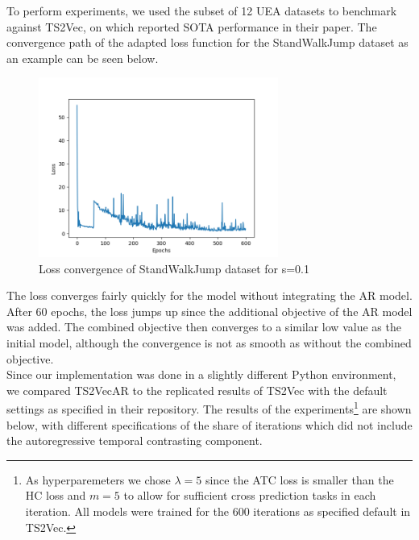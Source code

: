 \documentclass{article}
\begin{document}
To perform experiments, we used the subset of 12 UEA datasets to benchmark against TS2Vec, on which \citet{ts2vec} reported SOTA performance in their paper. The convergence path of the adapted loss function for the StandWalkJump dataset as an example can be seen below. \\

\begin{figure}[H]
  \centering
  \includegraphics[width=0.7\textwidth]{fig/StandWalkJump_default_ar_2.png}
  \caption{Loss convergence of StandWalkJump dataset for s=0.1}
\end{figure}

The loss converges fairly quickly for the model without integrating the AR model. After 60 epochs, the loss jumps up since the additional objective of the AR model was added. The combined objective then converges to a similar low value as the initial model, although the convergence is not as smooth as without the combined objective. \\

Since our implementation was done in a slightly different Python environment, we compared TS2VecAR to the replicated results of TS2Vec with the default settings as specified in their repository. The results of the experiments\footnote{As hyperparemeters we chose $\lambda = 5$ since the ATC loss is smaller than the HC loss and $m=5$ to allow for sufficient cross prediction tasks in each iteration. All models were trained for the 600 iterations as specified default in TS2Vec.} are shown below, with different specifications of the share of iterations which did not include the autoregressive temporal contrasting component. \\
\end{document}

